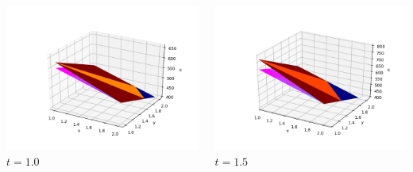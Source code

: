 \documentclass[]{beamer}
\begin{document}
\begin{frame}[t]
\begin{columns}
\begin{center}
			\includegraphics[scale=0.2]{figures/2D_rz_ls1m/2D_rz_ls1mat_u_vs_x_10}\\
			$t=1.0$
			\end{center}
			\begin{center}
			\includegraphics[scale=0.2]{figures/2D_rz_ls1m/2D_rz_ls1mat_u_vs_x_15}\\
			\tiny$t=1.5$			
			
			\null
			

\end{center}
\end{columns}
\end{frame}
\end{document}
